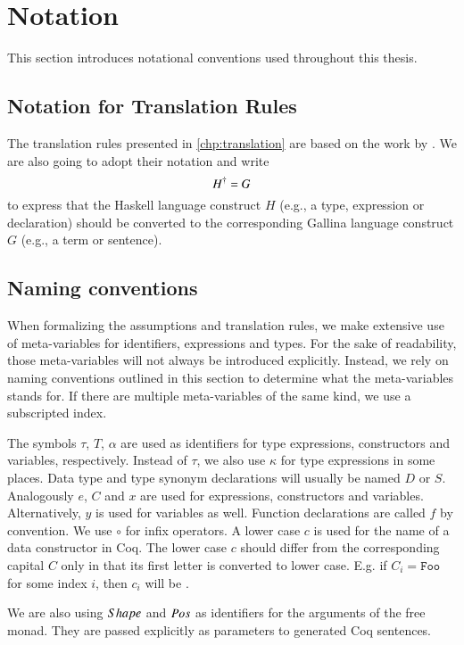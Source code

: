 \section{Notation} \label{sec:preliminaries:notation}
This section introduces notational conventions used throughout this thesis.

\subsection{Notation for Translation Rules} \label{sec:preliminaries:notation:rules}
The translation rules presented in \autoref{chp:translation} are based on the work by \cite{Abel:2005}.
We are also going to adopt their notation and write
\[
  {H}^{\dagger} = G
\]
to express that the Haskell language construct $H$ (e.g., a type, expression or declaration) should be converted to the corresponding Gallina language construct $G$ (e.g., a term or sentence).

\subsection{Naming conventions} \label{sec:preliminaries:notation:naming-conventions}
When formalizing the assumptions and translation rules, we make extensive use of meta-variables for identifiers, expressions and types.
For the sake of readability, those meta-variables will not always be introduced explicitly.
Instead, we rely on naming conventions outlined in this section to determine what the meta-variables stands for.
If there are multiple meta-variables of the same kind, we use a subscripted index.

The symbols $\tau$, $T$, $\alpha$ are used as identifiers for type expressions, constructors and variables, respectively.
Instead of $\tau$, we also use $\kappa$ for type expressions in some places.
Data type and type synonym declarations will usually be named $D$ or $S$.
Analogously $e$, $C$ and $x$ are used for expressions, constructors and variables.
Alternatively, $y$ is used for variables as well.
Function declarations are called $f$ by convention.
We use $\circ$ for infix operators.
A lower case $c$ is used for the name of a data constructor in Coq.
The lower case $c$ should differ from the corresponding capital $C$ only in that its first letter is converted to lower case.
E.g. if $C_i = \texttt{Foo}$ for some index $i$, then $c_i$ will be .

We are also using $Shape$ and $Pos$ as identifiers for the arguments of the free monad.
They are passed explicitly as parameters to generated Coq sentences.

